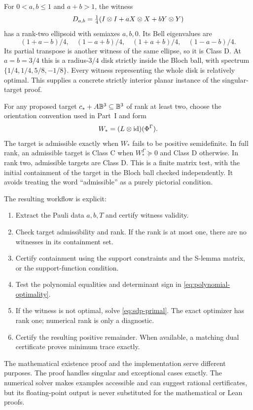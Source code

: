 For $0<a,b\leq1$ and $a+b>1$, the witness
\[
 D_{a,b}=\tfrac14(I\otimes I+aX\otimes X+bY\otimes Y)
\]
has a rank-two ellipsoid with semiaxes $a,b,0$. Its Bell eigenvalues are
\[
 (1+a-b)/4,\quad(1-a+b)/4,\quad(1+a+b)/4,\quad(1-a-b)/4.
\]
Its partial transpose is another witness of the same ellipse, so it is Class D. At $a=b=3/4$ this is a radius-$3/4$ disk strictly inside the Bloch ball, with spectrum $\{1/4,1/4,5/8,-1/8\}$. Every witness representing the whole disk is relatively optimal. This supplies a concrete strictly interior planar instance of the singular-target proof.

For any proposed target $c_*+A\mathbb B^3\subseteq\mathbb B^3$ of rank at least two, choose the orientation convention used in Part~I and form
\[
 W_*=(L\otimes\operatorname{id})(\Phi^\Gamma).
\]
The target is admissible exactly when $W_*$ fails to be positive semidefinite. In full rank, an admissible target is Class C when $W_*^\Gamma\succeq0$ and Class D otherwise. In rank two, admissible targets are Class D. This is a finite matrix test, with the initial containment of the target in the Bloch ball checked independently. It avoids treating the word ``admissible'' as a purely pictorial condition.

The resulting workflow is explicit:
\begin{enumerate}
\item Extract the Pauli data $a,b,T$ and certify witness validity.
\item Check target admissibility and rank. If the rank is at most one, there are no witnesses in its containment set.
\item Certify containment using the support constraints and the S-lemma matrix, or the support-function condition.
\item Test the polynomial equalities and determinant sign in \eqref{eq:polynomial-optimality}.
\item If the witness is not optimal, solve \eqref{eq:sdp-primal}. The exact optimizer has rank one; numerical rank is only a diagnostic.
\item Certify the resulting positive remainder. When available, a matching dual certificate proves minimum trace exactly.
\end{enumerate}

The mathematical existence proof and the implementation serve different purposes. The proof handles singular and exceptional cases exactly. The numerical solver makes examples accessible and can suggest rational certificates, but its floating-point output is never substituted for the mathematical or Lean proofs.

